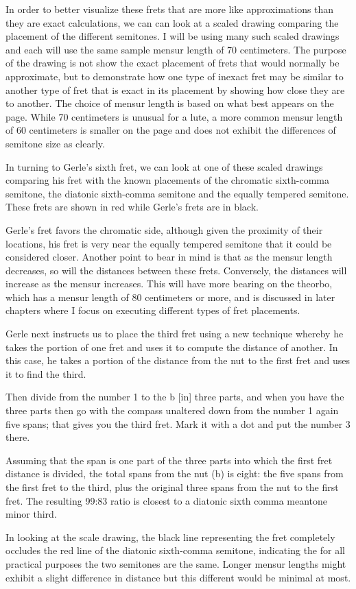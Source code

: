 In order to better visualize these frets that are more like approximations than they
are exact calculations, we can can look at a scaled drawing comparing the placement of
the different semitones.  I will be using many such scaled drawings and each will use
the same sample mensur length of 70 centimeters.  The purpose of the drawing is not
show the exact placement of frets that would normally be approximate, but to
demonstrate how one type of inexact fret may be similar to another type of fret that is
exact in its placement by showing how close they are to another.  The choice of mensur
length is based on what best appears on the page.  While 70 centimeters is unusual for
a lute, a more common mensur length of 60 centimeters is smaller on the page and does
not exhibit the differences of semitone size as clearly.

In turning to Gerle's sixth fret, we can look at one of these scaled drawings comparing
his fret with the known placements of the chromatic sixth-comma semitone, the diatonic
sixth-comma semitone and the equally tempered semitone.  These frets are shown in red
while Gerle's frets are in black.

Gerle's fret favors the chromatic side, although given the proximity of their
locations, his fret is very near the equally tempered semitone that it could be
considered closer. Another point to bear in mind is that as the mensur length
decreases, so will the distances between these frets.  Conversely, the distances will
increase as the mensur increases.  This will have more bearing on the theorbo, which
has a mensur length of 80 centimeters or more, and is discussed in later chapters where
I focus on executing different types of fret placements.

Gerle next instructs us to place the third fret using a new technique whereby he
takes the portion of one fret and uses it to compute the distance of another.
In this case, he takes a portion of the distance from the nut to the first fret
and uses it to find the third.
\begin{blocks}
Then divide from the number 1 to the b [in] three parts, and when you have the
three parts then go with the compass unaltered down from the number 1 again five
spans; that gives you the third fret.  Mark it with a dot and put the number 3
there.
\end{blocks}
Assuming that the span is one part of the three parts into which the first fret
distance is divided, the total spans from the nut (b) is eight: the five spans
from the first fret to the third, plus the original three spans from the nut to
the first fret.  The resulting 99:83 ratio is closest to a diatonic sixth comma
meantone minor third.

In looking at the scale drawing, the black line representing the fret completely
occludes the red line of the diatonic sixth-comma semitone, indicating the for all
practical purposes the two semitones are the same.  Longer mensur lengths might exhibit
a slight difference in distance but this different would be minimal at most.

